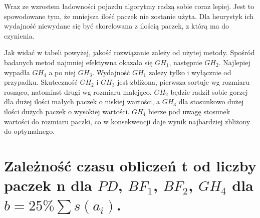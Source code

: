 \documentclass[polish,polish,a4paper]{article}
\begin{document}
\begin{spacing}{1.25}
	Wraz ze wzrostem ładowności pojazdu algorytmy radzą sobie coraz lepiej. Jest to spowodowane tym, że mniejsza ilość paczek nie zostanie użyta. Dla heurystyk ich wydajność niewydane się być skorelowana z ilością paczek, z którą ma do czynienia.
	
	Jak widać w tabeli powyżej, jakość rozwiązanie zależy od użytej metody. Spośród badanych metod najmniej efektywna okazała się $GH_{1}$, następnie $GH_{2}$. Najlepiej wypadła $GH_{4}$ a po niej $GH_{3}$. Wydajność $GH_{1}$ zależy tylko i wyłącznie od przypadku. Skuteczność $GH_{2}$ i $GH_{3}$ jest zbliżona, pierwsza sortuje wg rozmiaru rosnąco, natomiast drugi wg rozmiaru malejąco. $GH_{2}$ będzie radził sobie gorzej dla dużej ilości małych paczek o niskiej wartości, a $GH_{3}$ dla stosunkowo dużej ilości dużych paczek o wysokiej wartości. $GH_{4}$ bierze pod uwagę stosunek wartości do rozmiaru paczki, co w konsekwencji daje  wynik najbardziej zbliżony do optymalnego. 
	
	


































	
\section{Zależność czasu obliczeń t od liczby paczek n dla $PD$, $BF_{1}$, $BF_{2}$, $GH_{4}$ dla $b = 25 \% \sum s (a_{i})$. }
	

\end{spacing}
\end{document}
